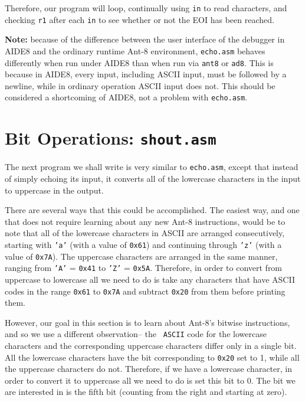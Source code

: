 Therefore, our program will loop, continually using {\tt in} to read
characters, and checking {\tt r1} after each {\tt in} to see whether
or not the EOI has been reached.



{\bf Note:} because of the difference between the user interface of
the debugger in {\sc AIDE8} and the ordinary runtime {\sc Ant-8}
environment, {\tt echo.asm} behaves differently when run under {\sc
AIDE8} than when run via {\tt ant8} or {\tt ad8}.  This is because in
{\sc AIDE8}, every input, including {\sc ASCII} input, must be followed
by a newline, while in ordinary operation {\sc ASCII} input does not. 
This should be considered a shortcoming of {\sc AIDE8}, not a problem
with {\tt echo.asm}.

\section{Bit Operations: {\tt shout.asm}}

The next program we shall write is very similar to {\tt echo.asm},
except that instead of simply echoing its input, it converts all of
the lowercase characters in the input to uppercase in the output.

There are several ways that this could be accomplished.  The easiest
way, and one that does not require learning about any new {\sc Ant-8}
instructions, would be to note that all of the lowercase characters in
{\sc ASCII} are arranged consecutively, starting with {\tt 'a'} (with
a value of {\tt 0x61}) and continuing through {\tt 'z'} (with a value
of {\tt 0x7A}).  The uppercase characters are arranged in the same
manner, ranging from {\tt 'A'} = {\tt 0x41} to {\tt 'Z'} = {\tt 0x5A}. 
Therefore, in order to convert from uppercase to lowercase all we need
to do is take any characters that have {\sc ASCII} codes in the range
{\tt 0x61} to {\tt 0x7A} and subtract {\tt 0x20} from them before
printing them.

However, our goal in this section is to learn about {\sc Ant-8}'s
bitwise instructions, and so we use a different observation-- the {\tt
ASCII} code for the lowercase characters and the corresponding
uppercase characters differ only in a single bit.  All the lowercase
characters have the bit corresponding to {\tt 0x20} set to 1, while
all the uppercase characters do not.  Therefore, if we have a
lowercase character, in order to convert it to uppercase all we need to
do is set this bit to 0.  The bit we are interested in is the fifth
bit (counting from the right and starting at zero).

